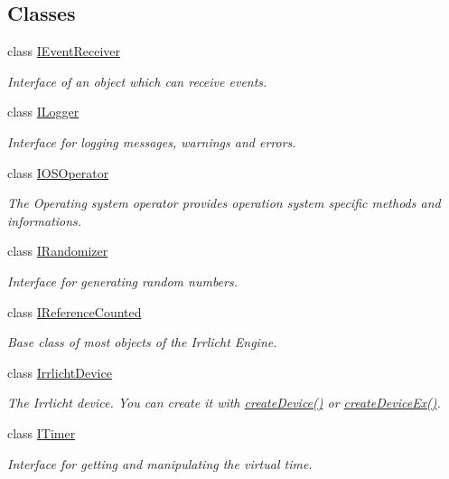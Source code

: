 \subsection*{Classes}
\begin{DoxyCompactItemize}
\item 
class \hyperlink{classirr_1_1IEventReceiver}{I\+Event\+Receiver}
\begin{DoxyCompactList}\small\item\em Interface of an object which can receive events. \end{DoxyCompactList}\item 
class \hyperlink{classirr_1_1ILogger}{I\+Logger}
\begin{DoxyCompactList}\small\item\em Interface for logging messages, warnings and errors. \end{DoxyCompactList}\item 
class \hyperlink{classirr_1_1IOSOperator}{I\+O\+S\+Operator}
\begin{DoxyCompactList}\small\item\em The Operating system operator provides operation system specific methods and informations. \end{DoxyCompactList}\item 
class \hyperlink{classirr_1_1IRandomizer}{I\+Randomizer}
\begin{DoxyCompactList}\small\item\em Interface for generating random numbers. \end{DoxyCompactList}\item 
class \hyperlink{classirr_1_1IReferenceCounted}{I\+Reference\+Counted}
\begin{DoxyCompactList}\small\item\em Base class of most objects of the Irrlicht Engine. \end{DoxyCompactList}\item 
class \hyperlink{classirr_1_1IrrlichtDevice}{Irrlicht\+Device}
\begin{DoxyCompactList}\small\item\em The Irrlicht device. You can create it with \hyperlink{namespaceirr_abaf4d8719cc26b0d30813abf85e47c76}{create\+Device()} or \hyperlink{namespaceirr_ac83a30d674204dcb94d70f849e9b4a62}{create\+Device\+Ex()}. \end{DoxyCompactList}\item 
class \hyperlink{classirr_1_1ITimer}{I\+Timer}
\begin{DoxyCompactList}\small\item\em Interface for getting and manipulating the virtual time. \end{DoxyCompactList}\item 

\end{DoxyCompactItemize}
